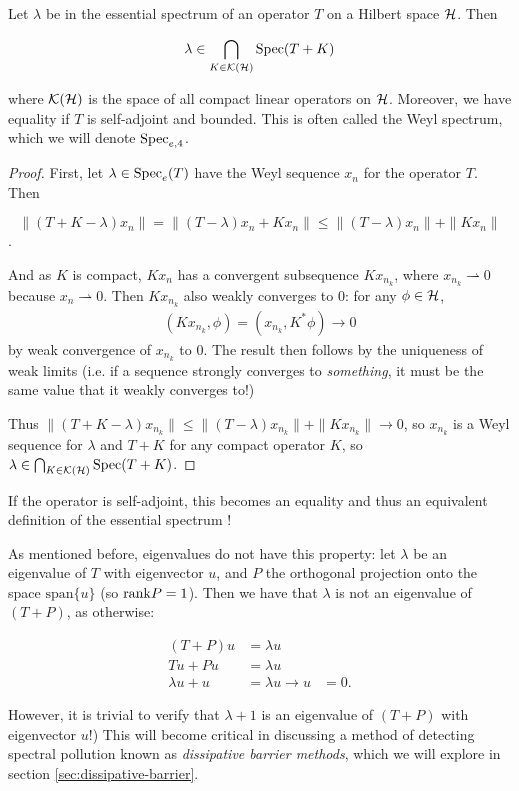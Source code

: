 \documentclass[../main.tex]{subfiles}
\begin{document}
\begin{theorem}
\label{thm:ess-spec-comp-ptb}
  Let $\lambda$ be in the essential spectrum of an operator $T$ on a Hilbert space
  $\mathcal{H}$. Then

  \begin{equation}
  \label{eqn:weyl_spectrum}
    \lambda \in \bigcap_{K \in \mathcal{K}(\mathcal{H})} \mathrm{Spec}(T + K)
  \end{equation}

  where $\mathcal{K}(\mathcal{H})$ is the space of all compact linear operators on $\mathcal{H}$.
  Moreover, we have equality if $T$ is self-adjoint and bounded.
  This is often called the Weyl spectrum, which we will denote $\mathrm{Spec}_{e,4}$.
\end{theorem}
\begin{proof}
First, let $\lambda \in \mathrm{Spec}_e(T)$ have the Weyl sequence $x_n$ for the operator $T$. Then 

$$\|(T+K-\lambda)x_n\| = \|(T - \lambda)x_n+Kx_n\| \leq \|(T - \lambda)x_n\| + \|Kx_n\|$$. 

And as $K$ is compact, $Kx_n$ has a convergent subsequence $Kx_{n_k}$, where
$x_{n_k} \rightharpoonup 0$ because $x_n \rightharpoonup 0$. Then
$Kx_{n_k}$ also weakly converges to 0: for any $\phi \in \mathcal{H}$,
\begin{align*}
(Kx_{n_k}, \phi) = (x_{n_k}, K^* \phi) \rightarrow 0
\end{align*}
by weak convergence of $x_{n_k}$ to 0. The result then follows by the uniqueness
of weak limits (i.e. if a sequence strongly converges to
\emph{something}, it must be the same value that it weakly converges to!)

Thus $\|(T+K-\lambda)x_{n_k}\| \leq \|(T - \lambda)x_{n_k}\| + \|Kx_{n_k}\|
\rightarrow 0$, so $x_{n_k}$ is a Weyl sequence for $\lambda$ and $T+K$
for any compact operator $K$, so $\lambda \in \bigcap_{K \in
\mathcal{K}(\mathcal{H})} \mathrm{Spec}(T + K)$.
\end{proof}

If the operator is self-adjoint, this becomes an equality and thus an equivalent
definition of the essential spectrum \cite{edmunds2018spectral}!

\begin{remark}
As mentioned before, eigenvalues do not have this property: let $\lambda$ be an
eigenvalue of $T$ with eigenvector $u$, and $P$ the orthogonal
projection onto the space $\mathrm{span}\{u\}$ (so $\mathrm{rank} P = 1$). Then we
have that $\lambda$ is not an eigenvalue of $(T+P)$, as otherwise:

\begin{align*}
  (T+P)u & = \lambda u \\
  Tu + Pu & = \lambda u \\
  \lambda u + u & = \lambda u
  \rightarrow u & = 0.
\end{align*}

However, it is trivial to
verify that $\lambda + 1$ is an eigenvalue of $(T+P)$ with eigenvector
$u$!) This will become critical in
discussing a method of detecting spectral pollution known as
\emph{dissipative barrier methods}, which we will explore in section
\ref{sec:dissipative-barrier}.
\end{remark}
\end{document}
